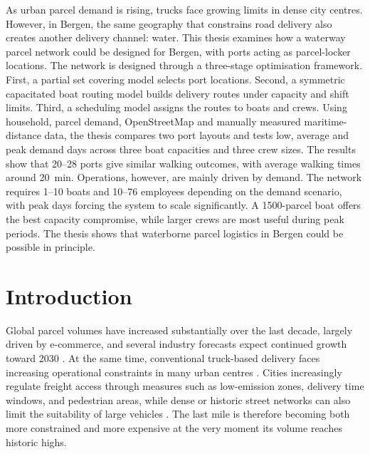 \documentclass[12pt]{article}
\begin{document}
As urban parcel demand is rising, trucks face growing limits in dense city centres. However, in Bergen, the same geography that constrains road delivery also creates another delivery channel: water. This thesis examines how a waterway parcel network could be designed for Bergen, with ports acting as parcel-locker locations. The network is designed through a three-stage optimisation framework. First, a partial set covering model selects port locations. Second, a symmetric capacitated boat routing model builds delivery routes under capacity and shift limits. Third, a scheduling model assigns the routes to boats and crews. Using household, parcel demand, OpenStreetMap and manually measured maritime-distance data, the thesis compares two port layouts and tests low, average and peak demand days across three boat capacities and three crew sizes. The results show that \numrange{20}{28} ports give similar walking outcomes, with average walking times around \qty{20}{\minute}. Operations, however, are mainly driven by demand. The network requires \numrange{1}{10} boats and \numrange{10}{76} employees depending on the demand scenario, with peak days forcing the system to scale significantly. A \num{1500}-parcel boat offers the best capacity compromise, while larger crews are most useful during peak periods. The thesis shows that waterborne parcel logistics in Bergen could be possible in principle.

\clearpage
\tableofcontents
\clearpage

\section{Introduction}
\label{sec:introduction}

Global parcel volumes have increased substantially over the last decade, largely driven by e-commerce, and several industry forecasts expect continued growth toward 2030 \parencite{pitney_bowes_index_2023,wef2020}. At the same time, conventional truck-based delivery faces increasing operational constraints in many urban centres \parencite{lastmileimprove,su14084701}. Cities increasingly regulate freight access through measures such as low-emission zones, delivery time windows, and pedestrian areas, while dense or historic street networks can also limit the suitability of large vehicles \parencite{su151612266,MILENKOVIC2024101157,sustainableverlinde}. The last mile is therefore becoming both more constrained and more expensive at the very moment its volume reaches historic highs.
\end{document}
